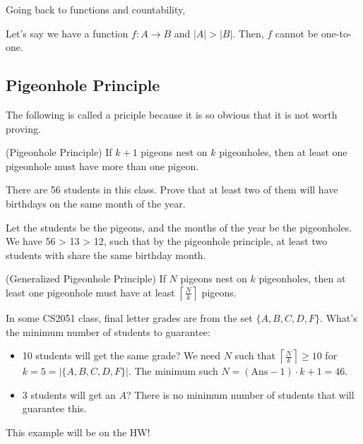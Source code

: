 
Going back to functions and countability,

\begin{prop}
	Let's say we have a function \( f : A \to B \) and \( |A| > |B| \). Then, \( f \) cannot be one-to-one. 
\end{prop}

\subsection{Pigeonhole Principle}

The following is called a priciple because it is so obvious that it is not worth proving.

\begin{theorem}
	(Pigeonhole Principle) If \( k+1 \) pigeons nest on \( k \) pigeonholes, then at least one pigeonhole must have more than one pigeon. 
\end{theorem}

\begin{eg}
	There are 56 students in this class. Prove that at least two of them will have birthdays on the same month of the year. 
\end{eg}

Let the students be the pigeons, and the months of the year be the pigeonholes. We have 56 > 13 > 12, such that by the pigeonhole principle, at least two students with share the same birthday month.

\begin{theorem}
	(Generalized Pigeonhole Principle) If \( N \) pigeons nest on \( k \) pigeonholes, then at least one pigeonhole must have at least \( \left\lceil \frac{N}{k} \right\rceil \) pigeons. 
\end{theorem}

\begin{eg}
	In some CS2051 class, final letter grades are from the set \( \{A,B,C,D,F\}   \). What's the minimum number of students to guarantee:
	\begin{itemize}
		\item 10 students will get the same grade?
			We need \( N \) such that \( \left\lceil \frac{N}{k} \right\rceil \ge 10 \) for \( k=5=|\{A,B,C,D,F\} |  \). The minimum such \( N=(\text{Ans}-1)\cdot k + 1 = 46\).
		\item 3 students will get an \( A \)? There is no minimum number of students that will guarantee this. 
	\end{itemize}
	This example will be on the HW!
\end{eg}

